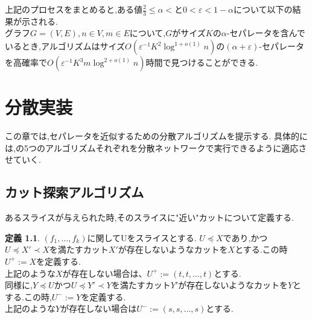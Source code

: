 \documentclass{thesis}
\theoremstyle{definition}
\newtheorem{definition}{定義}
\begin{document}
上記のプロセスをまとめると,ある値$\frac{2}{3} \leq \alpha <$と$0 < \varepsilon <1-\alpha$について以下の結果が示される.\\
グラフ$G=(V,E),n \in V,m \in E$について,$G$がサイズ$K$の$\alpha$-セパレータを含んでいるとき,アルゴリズムはサイズ$O(\varepsilon^{-1} K^2 \log^{1+o(1)}n)$の$(\alpha + \varepsilon)$-セパレータを高確率で$O(\varepsilon^{-1}K^3m\log^{2+o(1)}n)$時間で見つけることができる.

\chapter{分散実装}
この章では,セパレータを近似するための分散アルゴリズムを提示する.
具体的には,\cite{brandt2017approximating}の5つのアルゴリズムそれぞれを分散ネットワークで実行できるように適応させていく.

\section{カット探索アルゴリズム}
あるスライスが与えられた時,そのスライスに"近い"カットについて定義する.

\begin{definition}
    $(f_1, \dots ,f_k)$に関してUをスライスとする.
    $U\preceq X$であり,かつ$U\preceq X'\prec X$を満たすカット$X'$が存在しないようなカットを$X$とする.この時$U^+:=X$を定義する.\\
    上記のような$X$が存在しない場合は、$U^+:=(t,t,\dots,t)$とする.\\
    同様に,$Y\preceq U$かつ$U\preceq Y'\prec Y$を満たすカット$Y'$が存在しないようなカットを$Y$とする.この時,$U^-:=Y$を定義する.\\
    上記のような$Y$が存在しない場合は$U^-:=(s,s,\dots,s)$とする. 
\end{definition}
\end{document}
